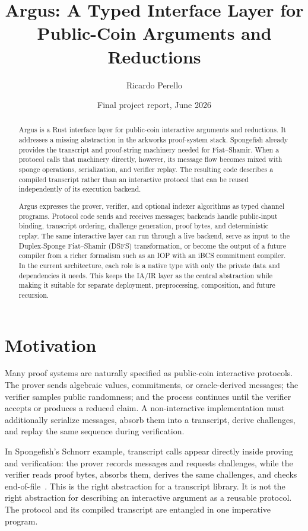 \documentclass[11pt]{article}
\title{Argus: A Typed Interface Layer for Public-Coin Arguments and Reductions}
\author{Ricardo Perello}
\date{Final project report, June 2026}
\begin{document}
\maketitle

\begin{abstract}
Argus is a Rust interface layer for public-coin interactive arguments and
reductions. It addresses a missing abstraction in the arkworks proof-system
stack. Spongefish already provides the transcript and proof-string machinery
needed for Fiat--Shamir. When a protocol calls that machinery directly,
however, its message flow becomes mixed with sponge operations, serialization,
and verifier replay. The resulting code describes a compiled transcript rather
than an interactive protocol that can be reused independently of its execution
backend.

Argus expresses the prover, verifier, and optional indexer algorithms as typed
channel programs. Protocol code sends and receives messages; backends handle
public-input binding, transcript ordering, challenge generation, proof bytes,
and deterministic replay. The same interactive layer can run through a live
backend, serve as input to the Duplex-Sponge Fiat--Shamir (DSFS) transformation,
or become the output of a future compiler from a richer formalism such as an
IOP with an iBCS commitment compiler. In the current architecture, each role is
a native type with only the private data and dependencies it needs. This keeps
the IA/IR layer as the central abstraction while making it suitable for
separate deployment, preprocessing, composition, and future recursion.
\end{abstract}

\section{Motivation}

Many proof systems are naturally specified as public-coin interactive
protocols. The
prover sends algebraic values, commitments, or oracle-derived messages; the
verifier samples public randomness; and the process continues until the
verifier accepts or produces a reduced claim. A non-interactive implementation
must additionally serialize messages, absorb them into a transcript, derive
challenges, and replay the same sequence during verification.

In Spongefish's Schnorr example, transcript calls appear directly inside
proving and verification: the prover records messages and requests challenges,
while the verifier reads proof bytes, absorbs them, derives the same
challenges, and checks end-of-file~\cite{spongefish-schnorr}. This is the right
abstraction for a transcript library. It is not the right abstraction for
describing an interactive argument as a reusable protocol. The protocol and
its compiled transcript are entangled in one imperative program.
\end{document}
